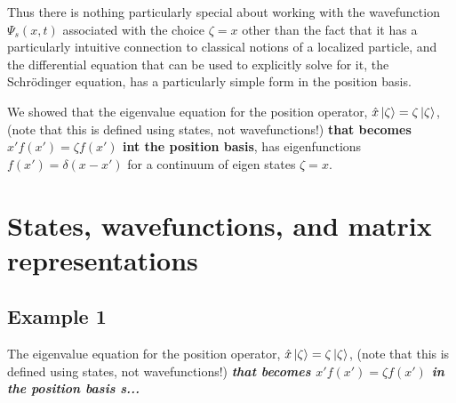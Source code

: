 \documentclass{article}
\begin{document}
Thus there is nothing particularly special about working with the wavefunction $\Psi_s(x,t)$ associated with the choice $\zeta = x$ other than the fact that it has a particularly intuitive connection to classical notions of a localized particle, and the differential equation that can be used to explicitly solve for it, the Schrödinger equation, has a particularly simple form in the position basis. 

We showed that the eigenvalue equation for the position operator, $\hat{x} \ket{\zeta} = \zeta \ket{\zeta}$, (note that this is defined using states, not wavefunctions!) \textbf{that becomes $x' f(x') = \zeta f(x')$ int the position basis}, has eigenfunctions $f(x') = \delta(x - x')$ for a continuum of eigen states $\zeta = x$. 



\section{States, wavefunctions, and matrix representations}

\subsection{Example 1}

The eigenvalue equation for the position operator, $\hat{x} \ket{\zeta} = \zeta \ket{\zeta}$, (note that this is defined using states, not wavefunctions!) \textbf{\textit{that becomes $x' f(x') = \zeta f(x')$ in the position basis s...}}
\end{document}
